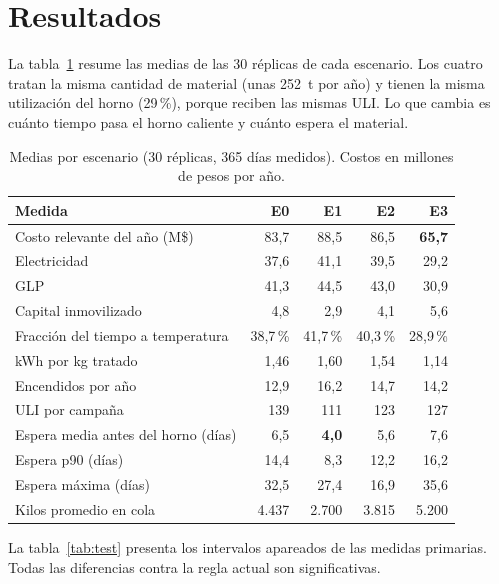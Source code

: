 \documentclass[a4paper,11pt]{article}
\begin{document}
\section{Resultados}

La tabla~\ref{tab:resultados} resume las medias de las 30 réplicas de cada escenario. Los cuatro tratan la
misma cantidad de material (unas 252~t por año) y tienen la misma utilización del horno (29\,\%), porque reciben
las mismas ULI. Lo que cambia es cuánto tiempo pasa el horno caliente y cuánto espera el material.

\begin{table}[H]
\centering\small
\caption{Medias por escenario (30 réplicas, 365 días medidos). Costos en millones de pesos por año.}
\label{tab:resultados}
\begin{tabular}{@{}lrrrr@{}}
\toprule
Medida & E0 & E1 & E2 & E3 \\
\midrule
Costo relevante del año (M\$) & 83,7 & 88,5 & 86,5 & \textbf{65,7} \\
\quad Electricidad & 37,6 & 41,1 & 39,5 & 29,2 \\
\quad GLP & 41,3 & 44,5 & 43,0 & 30,9 \\
\quad Capital inmovilizado & 4,8 & 2,9 & 4,1 & 5,6 \\
Fracción del tiempo a temperatura & 38,7\,\% & 41,7\,\% & 40,3\,\% & 28,9\,\% \\
kWh por kg tratado & 1,46 & 1,60 & 1,54 & 1,14 \\
Encendidos por año & 12,9 & 16,2 & 14,7 & 14,2 \\
ULI por campaña & 139 & 111 & 123 & 127 \\
Espera media antes del horno (días) & 6,5 & \textbf{4,0} & 5,6 & 7,6 \\
Espera p90 (días) & 14,4 & 8,3 & 12,2 & 16,2 \\
Espera máxima (días) & 32,5 & 27,4 & 16,9 & 35,6 \\
Kilos promedio en cola & 4.437 & 2.700 & 3.815 & 5.200 \\
\bottomrule
\end{tabular}
\end{table}

La tabla~\ref{tab:test} presenta los intervalos apareados de las medidas primarias. Todas las diferencias
contra la regla actual son significativas.
\end{document}
